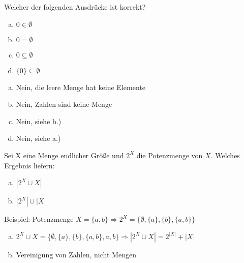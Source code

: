 \begin{card}
	Welcher der folgenden Ausdrücke ist korrekt?
	\begin{enumerate}[a)]
	\item $0 \in \emptyset$
	\item $0 = \emptyset$
	\item $0 \subseteq \emptyset$
	\item $\{0\} \subseteq \emptyset$
	\end{enumerate}
	\hr
	\begin{enumerate}[a)]
	\item Nein, die leere Menge hat keine Elemente
	\item Nein, Zahlen sind keine Menge
	\item Nein, siehe b.)
	\item Nein, siehe a.)
	\end{enumerate}
\end{card}

\begin{card}
	Sei X eine Menge endlicher Größe und $2^X$ die Potenzmenge von $X$. Welches Ergebnis liefern:
	\begin{enumerate}[a)]
	\item $|2^X \cup X|$
	\item $|2^X| \cup |X|$
	\end{enumerate}
	\hr
	Beispiel: Potenzmenge  $X = \{ a,b \} \Rightarrow 2^X = \{ \emptyset, \{ a \}, \{ b \} , \{ a,b \} \}$
	\begin{enumerate}[a)]
	\item $2^X \cup X = \{ \emptyset, \{ a \}, \{ b \} , \{ a,b \}, a, b\} \Rightarrow 
	|2^X \cup X| = 2^{|X|} + |X|$
	\item \lightning Vereinigung von Zahlen, nicht Mengen
	\end{enumerate}
\end{card}
